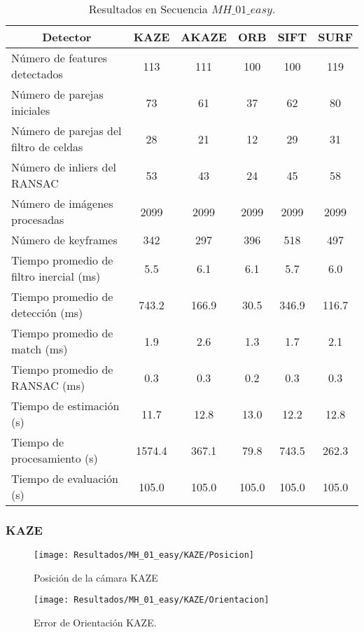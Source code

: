 \begin{table}[htbp]
	\caption{Resultados en Secuencia $MH\_ 01\_ easy$.}
	\begin{tabular}{|l|c|c|c|c|c|}
		\hline
		\multicolumn{1}{|c|}{\textbf{Detector}} & \textbf{KAZE} & \textbf{AKAZE} & \textbf{ORB} & \textbf{SIFT} & \textbf{SURF} \\ \hline
		Número de features detectados & 113 & 111 & 100 & 100 & 119 \\ \hline
		Número de parejas iniciales & 73 & 61 & 37 & 62 & 80 \\ \hline
		Número de parejas del filtro de celdas & 28 & 21 & 12 & 29 & 31 \\ \hline
		Número de inliers del RANSAC & 53 & 43 & 24 & 45 & 58 \\ \hline
		Número de imágenes procesadas & 2099 & 2099 & 2099 & 2099 & 2099 \\ \hline
		Número de keyframes & 342 & 297 & 396 & 518 & 497 \\ \hline
		Tiempo promedio de filtro inercial (ms) & 5.5 & 6.1 & 6.1 & 5.7 & 6.0 \\ \hline
		Tiempo promedio de detección  (ms) & 743.2 & 166.9 & 30.5 & 346.9 & 116.7 \\ \hline
		Tiempo promedio de match (ms) & 1.9 & 2.6 & 1.3 & 1.7 & 2.1 \\ \hline
		Tiempo promedio de RANSAC (ms) & 0.3 & 0.3 & 0.2 & 0.3 & 0.3 \\ \hline
		Tiempo de estimación (s) & 11.7 & 12.8 & 13.0 & 12.2 & 12.8 \\ \hline
		Tiempo de  procesamiento (s) & 1574.4 & 367.1 & 79.8 & 743.5 & 262.3 \\ \hline
		Tiempo de evaluación (s) & 105.0 & 105.0 & 105.0 & 105.0 & 105.0 \\ \hline
	\end{tabular}
	\label{Tabla/Resultados/MH_01_easy}
\end{table}


\subsubsection{KAZE}


\begin{figure}[H]
	\centering
	\texttt{[image: Resultados/MH\_01\_easy/KAZE/Posicion]}
	\caption{Posición de la cámara KAZE}
	\label{imagen:Resultados/MH_01_easy/KAZE/Posicion}
\end{figure}


\begin{figure}[H]
	\centering
	\texttt{[image: Resultados/MH\_01\_easy/KAZE/Orientacion]}
	\caption[Error de Orientación KAZE]{Error de Orientación KAZE.}
	\label{imagen:Resultados/MH_01_easy/KAZE/Orientacion}
\end{figure}



